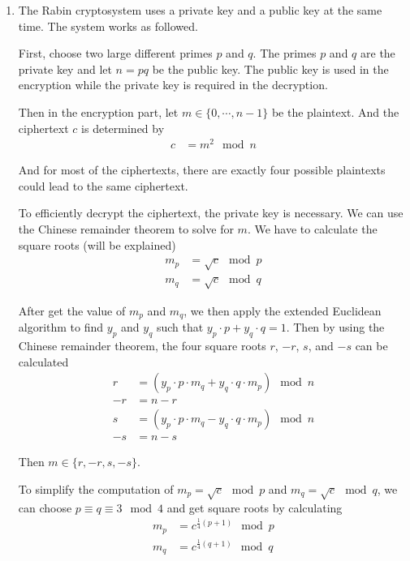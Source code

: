 \documentclass[11pt,a4paper]{article}
\begin{document}
\begin{enumerate}
	\item The Rabin cryptosystem uses a private key and a public key at the same time. The system works as followed.
	\par First, choose two large different primes $p$ and $q$. The primes $p$ and $q$ are the private key and let $n = pq$ be the public key. The public key is used in the encryption while the private key is required in the decryption.
	\par Then in the encryption part, let $m \in \{ 0, \cdots, n-1 \}$ be the plaintext. And the ciphertext $c$ is determined by
		\begin{align*}
			c &= m^{2} \mod n
		\end{align*}
	\par And for most of the ciphertexts, there are exactly four possible plaintexts could lead to the same ciphertext.
	\par To efficiently decrypt the ciphertext, the private key is necessary. We can use the Chinese remainder theorem to solve for $m$. We have to calculate the square roots (will be explained)
		\begin{align*}
			m_{p} &= \sqrt{c} \mod p \\
			m_{q} &= \sqrt{c} \mod q
		\end{align*}
	\par After get the value of $m_{p}$ and $m_{q}$, we then apply the extended Euclidean algorithm to find $y_{p}$ and $y_{q}$ such that $y_{p}\cdot p + y_{q}\cdot q = 1$. Then by using the Chinese remainder theorem, the four square roots $r$, $-r$, $s$, and $-s$ can be calculated
        \begin{align*}
            r &= (y_{p} \cdot p \cdot m_{q} + y_{q} \cdot q \cdot m_{p}) \mod n \\
            -r &= n - r \\
            s &= (y_{p} \cdot p \cdot m_{q} - y_{q} \cdot q \cdot m_{p}) \mod n \\
            -s &= n - s
        \end{align*}
    \par Then $m \in \{ r, -r, s, -s \}$.
    \par To simplify the computation of $m_{p} = \sqrt{c} \mod p$ and $m_{q} = \sqrt{c} \mod q$, we can choose $p \equiv q \equiv 3 \mod 4$ and get square roots by calculating
        \begin{align*}
            m_{p} &= c^{\frac{1}{4}(p+1)} \mod p \\
            m_{q} &= c^{\frac{1}{4}(q+1)} \mod q
        \end{align*}


\end{enumerate}
\end{document}
